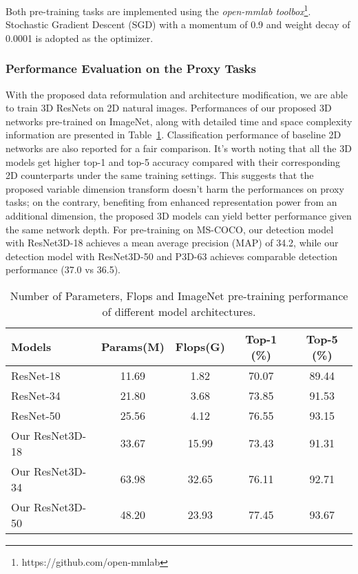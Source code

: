 \documentclass[journal,twoside,web]{ieeecolor}
\begin{document}
Both pre-training tasks are implemented using the \textit{open-mmlab toolbox}\footnote{https://github.com/open-mmlab}. Stochastic Gradient Descent (SGD) with a momentum of 0.9 and weight decay of 0.0001 is adopted as the optimizer. 







\subsubsection{Performance Evaluation on the Proxy Tasks}

With the proposed data reformulation and architecture modification, we are able to train 3D ResNets on 2D natural images.
Performances of our proposed 3D networks pre-trained on ImageNet, along with detailed time and space complexity information are presented in Table~\ref{Pretrain}. 
Classification performance of baseline 2D networks are also reported for a fair comparison. 
It's worth noting that all the 3D models get higher top-1 and top-5 accuracy compared with their corresponding 2D counterparts under the same training settings. 
This suggests that the proposed variable dimension transform doesn't harm the performances on proxy tasks; on the contrary, benefiting from enhanced representation power from an additional dimension, the proposed 3D models can yield better performance given the same network depth.
For pre-training on MS-COCO, our detection model with ResNet3D-18 achieves a mean average precision (MAP) of 34.2, while our detection model with ResNet3D-50 and P3D-63 achieves comparable detection performance (37.0 vs 36.5). 




\begin{table}\centering
    \footnotesize \renewcommand{\arraystretch}{1.2}\setlength{\belowcaptionskip}{5pt}
    \caption{Number of Parameters, Flops and ImageNet pre-training performance of different model architectures.}    
    \label{Pretrain}
    \begin{tabular}{lcccc}
        \toprule
        Models &  Params(M) & Flops(G) & Top-1 (\%) & Top-5 (\%) \\
        \midrule
        ResNet-18  & 11.69 & 1.82 & 70.07 & 89.44 \\ 
        ResNet-34  & 21.80 & 3.68 & 73.85 & 91.53 \\ 
        ResNet-50  & 25.56 & 4.12 & 76.55 & 93.15 \\
        \midrule
Our ResNet3D-18 & 33.67 & 15.99 & 73.43 & 91.31 \\ 
        Our ResNet3D-34 & 63.98 & 32.65 & 76.11 & 92.71 \\ 
        Our ResNet3D-50 & 48.20 & 23.93 & 77.45 & 93.67  \\ 
\bottomrule
    \end{tabular}
\end{table}
\end{document}
